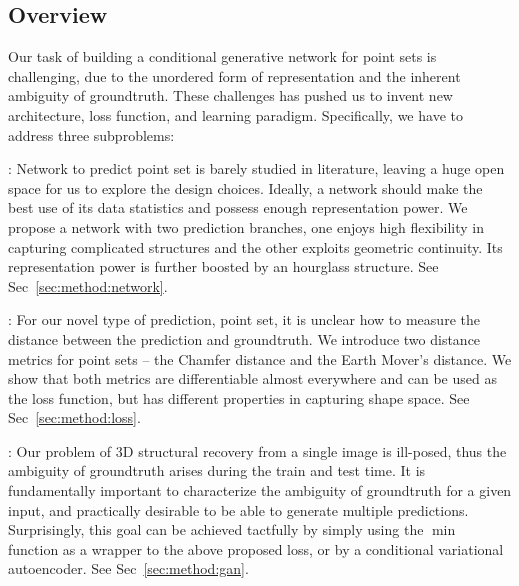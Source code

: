 \subsection{Overview}

% 
% 

Our task of building a conditional generative network for point sets is challenging, due to the unordered form of representation and the inherent ambiguity of groundtruth. These challenges has pushed us to invent new architecture, loss function, and learning paradigm. Specifically, we have to address three subproblems: 

: Network to predict point set is barely studied in literature, leaving a huge open space for us to explore the design choices. Ideally, a network should make the best use of its data statistics and possess enough representation power. We propose a network with two prediction branches, one enjoys high flexibility in capturing complicated structures and the other exploits geometric continuity. Its representation power is further boosted by an hourglass structure. See Sec~\ref{sec:method:network}. 

: For our novel type of prediction, point set, it is unclear how to measure the distance between the prediction and groundtruth. We introduce two distance metrics for point sets -- the Chamfer distance and the Earth Mover's distance. We show that both metrics are differentiable almost everywhere and can be used as the loss function, but has different properties in capturing shape space. See Sec~\ref{sec:method:loss}.

: Our problem of 3D structural recovery from a single image is ill-posed, thus the ambiguity of groundtruth arises during the train and test time. It is fundamentally important to characterize the ambiguity of groundtruth for a given input, and practically desirable to be able to generate multiple predictions. Surprisingly, this goal can be achieved tactfully by simply using the $\min$ function as a wrapper to the above proposed loss, or by a conditional variational autoencoder.  See Sec~\ref{sec:method:gan}.

